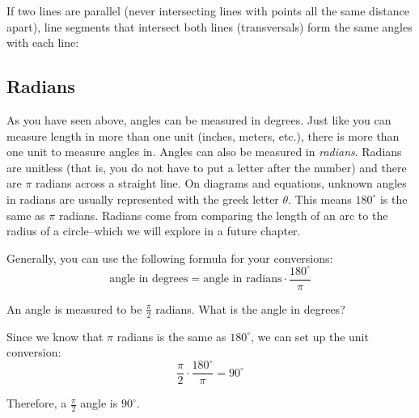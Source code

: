 If two lines are parallel (never intersecting lines with points all the same distance apart), line segments that intersect both lines (transversals) form the
same angles with each line:
\begin{center}
\end{center}


\subsection{Radians}
As you have seen above, angles can be measured in degrees. Just like you can 
measure length in more than one unit (inches, meters, etc.), there is more 
than one unit to measure angles in. Angles can also be measured in \textit{
radians}. Radians are unitless (that is, you do not have to put 
a letter after the number) and there are $\pi$ radians across a straight line. 
On diagrams and equations, unknown angles in radians are usually represented with the greek letter $\theta$.
This means $180^\circ$ is the same as $\pi$ radians. 
Radians come from comparing the length of an arc to the radius of a circle--which we will explore in a future chapter.

Generally, you can use the following formula for your conversions:
$${\displaystyle {\text{angle in degrees}}={\text{angle in radians}}\cdot {\frac {180^{\circ }}{\pi }}}$$

\begin{Worked}
\begin{Problem}
An angle is measured to be $\frac{\pi}{2}$ radians. What is 
the angle in degrees?
\end{Problem}
\begin{Solution}
Since we know that $\pi$ radians is the same as $180^\circ$,
we can set up the unit conversion:
$$\frac{\pi}{2} \cdot \frac{180^\circ}{\pi} = 90^\circ$$

Therefore, a $\frac{\pi}{2}$ angle is $90^\circ$.
\end{Solution}
\end{Worked}


